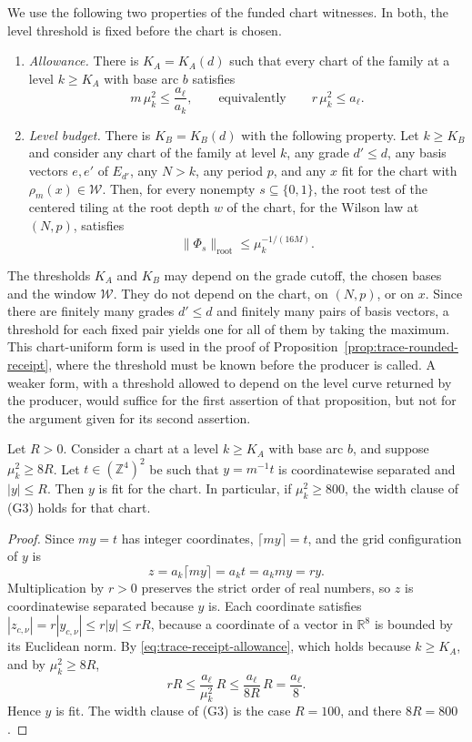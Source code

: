 We use the following two properties of the funded chart witnesses. In
both, the level threshold is fixed before the chart is chosen.
\begin{enumerate}
\item[(A)] \emph{Allowance.} There is $K_A=K_A(d)$ such that every chart
 of the family at a level $k\ge K_A$ with base arc $b$ satisfies
 \begin{equation}\label{eq:trace-receipt-allowance}
  m\,\mu_k^{2}\le\frac{a_\ell}{a_k},
  \qquad\text{equivalently}\qquad r\,\mu_k^2\le a_\ell .
 \end{equation}
\item[(B)] \emph{Level budget.} There is $K_B=K_B(d)$ with the following
 property. Let $k\ge K_B$ and consider any chart of the family at level
 $k$, any grade $d'\le d$, any basis vectors $e,e'$ of $E_{d'}$, any
 $N>k$, any period $p$, and any $x$ fit for the chart with
 $\rho_m(x)\in\mathcal W$. Then, for every nonempty
 $s\subseteq\{0,1\}$, the root test of the centered tiling at the root
 depth $w$ of the chart, for the Wilson law at $(N,p)$, satisfies
 \begin{equation}\label{eq:trace-receipt-budget}
  \|\Phi_s\|_{\mathrm{root}}\le\mu_k^{-1/(16M)} .
 \end{equation}
\end{enumerate}
The thresholds $K_A$ and $K_B$ may depend on the grade cutoff, the chosen
bases and the window $\mathcal W$. They do not depend on the chart, on
$(N,p)$, or on $x$. Since there are finitely many grades $d'\le d$ and
finitely many pairs of basis vectors, a threshold for each fixed pair
yields one for all of them by taking the maximum. This chart-uniform form
is used in the proof of Proposition~\ref{prop:trace-rounded-receipt},
where the threshold must be known before the producer is called. A
weaker form, with a threshold allowed to depend on the level curve
returned by the producer, would suffice for the first assertion of that
proposition, but not for the argument given for its second assertion.

\begin{lemma}\label{lem:trace-receipt-width}
Let $R>0$. Consider a chart at a level $k\ge K_A$ with base arc $b$, and
suppose $\mu_k^2\ge8R$. Let $t\in(\mathbb Z^4)^2$ be such that
$y=m^{-1}t$ is coordinatewise separated and $|y|\le R$. Then $y$ is fit
for the chart. In particular, if $\mu_k^2\ge800$, the width clause of
(G3) holds for that chart.
\end{lemma}
\begin{proof}
Since $my=t$ has integer coordinates, $\lceil my\rceil=t$, and the grid
configuration of $y$ is
\[
 z=a_k\lceil my\rceil=a_kt=a_kmy=ry .
\]
Multiplication by $r>0$ preserves the strict order of real numbers, so
$z$ is coordinatewise separated because $y$ is. Each coordinate
satisfies $|z_{c,\nu}|=r|y_{c,\nu}|\le r|y|\le rR$, because a coordinate
of a vector in $\mathbb R^{8}$ is bounded by its Euclidean norm. By
\eqref{eq:trace-receipt-allowance}, which holds because $k\ge K_A$, and
by $\mu_k^2\ge8R$,
\[
 rR\le\frac{a_\ell}{\mu_k^2}\,R\le\frac{a_\ell}{8R}\,R=\frac{a_\ell}{8}.
\]
Hence $y$ is fit. The width clause of (G3) is the case $R=100$, and
there $8R=800$.
\end{proof}

